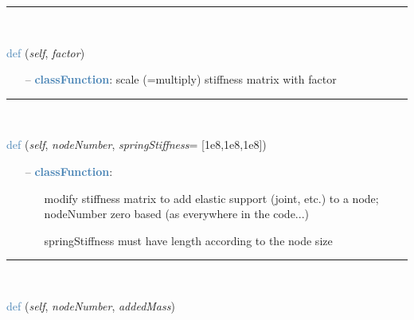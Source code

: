 \begin{itemize}[leftmargin=1.4cm]
\begin{itemize}[leftmargin=1.4cm]
\begin{itemize}[leftmargin=0.5cm]
\begin{itemize}[leftmargin=1.4cm]
\begin{itemize}[leftmargin=1.4cm]
\begin{itemize}[leftmargin=0.5cm]
%
\noindent\rule{8cm}{0.75pt}\vspace{1pt} \\ 
\begin{flushleft}
\noindent \textcolor{steelblue}{def {\bf {}}}\label{sec:FEM:FEMinterface:ScaleStiffnessMatrix}
({\it self}, {\it factor})
\end{flushleft}
\setlength{\itemindent}{0.7cm}
\begin{itemize}[leftmargin=0.7cm]
  \item[--]  \textcolor{steelblue}{\bf classFunction}: scale (=multiply) stiffness matrix with factor\vspace{12pt}\end{itemize}
%
\noindent\rule{8cm}{0.75pt}\vspace{1pt} \\ 
\begin{flushleft}
\noindent \textcolor{steelblue}{def {\bf {}}}\label{sec:FEM:FEMinterface:AddElasticSupportAtNode}
({\it self}, {\it nodeNumber}, {\it springStiffness}= [1e8,1e8,1e8])
\end{flushleft}
\setlength{\itemindent}{0.7cm}
\begin{itemize}[leftmargin=0.7cm]
  \item[--]  \textcolor{steelblue}{\bf classFunction}: \vspace{-6pt}
  \begin{itemize}[leftmargin=1.2cm]
\setlength{\itemindent}{-0.7cm}
    \item[] modify stiffness matrix to add elastic support (joint, etc.) to a node; nodeNumber zero based (as everywhere in the code...)
    \item[] springStiffness must have length according to the node size
  \end{itemize}
\vspace{12pt}\end{itemize}
%
\noindent\rule{8cm}{0.75pt}\vspace{1pt} \\ 
\begin{flushleft}
\noindent \textcolor{steelblue}{def {\bf {}}}\label{sec:FEM:FEMinterface:AddNodeMass}
({\it self}, {\it nodeNumber}, {\it addedMass})
\end{flushleft}

\end{itemize}
\end{itemize}
\end{itemize}
\end{itemize}
\end{itemize}
\end{itemize}
